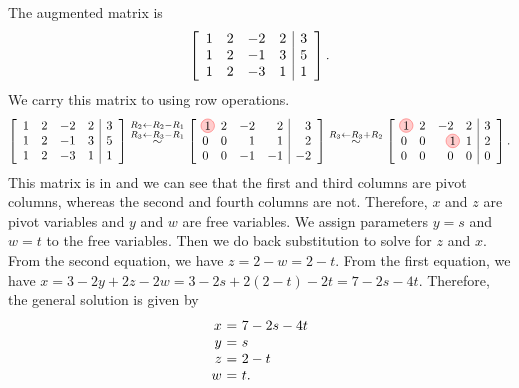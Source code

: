 \begin{solution} The augmented matrix is
  \begin{equation*}
    \left[
    \begin{array}{rrrr|r}
      1 & 2 & -2 & 2 & 3 \\
      1 & 2 & -1 & 3 & 5 \\
      1 & 2 & -3 & 1 & 1
    \end{array}
    \right].
  \end{equation*}
  We carry this matrix to {\ef} using row operations.
  \begin{equation*}
    \leftB
    \begin{array}{rrrr|r}
      1 & 2 & -2 & 2 & 3 \\
      1 & 2 & -1 & 3 & 5 \\
      1 & 2 & -3 & 1 & 1
    \end{array}
    \rightB
    \stackrel{R_2\leftarrow R_2-R_1}{\stackrel{R_3\leftarrow R_3-R_1}{\sim}}
    \leftB
    \begin{array}{rrrr|r}
      \circled{1} & 2 & -2 & 2 & 3 \\
      0 & 0 & 1 & 1 & 2 \\
      0 & 0 & -1 & -1 & -2
    \end{array}
    \rightB
    \stackrel{R_3\leftarrow R_3+R_2}{\sim}
    \leftB
    \begin{array}{rrrr|r}
      \circled{1} & 2 & -2 & 2 & 3 \\
      0 & 0 & \circled{1} & 1 & 2 \\
      0 & 0 & 0 & 0 & 0
    \end{array}
    \rightB.
  \end{equation*}
  This matrix is in {\ef} and we can see that the first and third
  columns are pivot columns, whereas the second and fourth columns are
  not. Therefore, $x$ and $z$ are pivot variables and $y$ and $w$ are
  free variables. We assign parameters $y=s$ and $w=t$ to the free
  variables. Then we do back substitution to solve for $z$ and $x$.
  From the second equation, we have $z=2-w=2-t$. From the first
  equation, we have $x=3-2y+2z-2w = 3-2s+2(2-t)-2t =
  7-2s-4t$. Therefore, the general solution is given by
  \begin{equation*}
    \begin{array}{r@{~}c@{~}l}
      x &=& 7-2s-4t \\
      y &=& s \\
      z &=& 2-t \\
      w &=& t.
    \end{array}

\end{equation*}
\end{solution}
